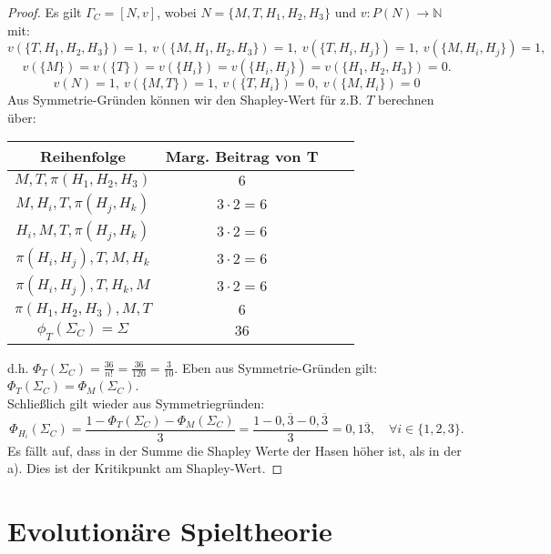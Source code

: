 \documentclass[12pt]{extreport} %
\newcommand{\N}{\mathbb{N}}
\theoremstyle{named}
\theoremstyle{itshape}
\theoremstyle{normal}
\begin{document}
\begin{enumerate}
 		\begin{proof}
 			Es gilt $\Gamma_C = [N, v]$, wobei $N = \{ M, T, H_{1}, H_{2}, H_{3} \}$ und $v \colon P(N) \rightarrow \N$ mit:
 			$$ v(\{T, H_{1}, H_{2}, H_{3} \}) = 1, ~ v(\{M, H_{1}, H_{2}, H_{3} \}) = 1,  ~ v(\{T, H_{i}, H_{j} \}) = 1, ~ v(\{M, H_{i}, H_{j} \}) = 1,$$
 			$$  v(\{M\}) = v(\{T\}) = v(\{ H_{i} \}) = v(\{ H_{i}, H_{j} \}) = v(\{ H_{1}, H_{2}, H_{3} \}) = 0. $$
 			$$ v(N) = 1, ~ v(\{M, T\}) = 1, ~v(\{T, H_{i}\}) = 0, ~ v(\{M, H_{i}\}) = 0$$
			Aus Symmetrie-Gründen können wir den Shapley-Wert für z.B. $T$ berechnen über:
  			\begin{center}
    			\begin{tabular}{| c | c | c | c |}
   					\hline
    					Reihenfolge & Marg. Beitrag von T \\ 
    						\hline
    					$M, T, \pi(H_{1}, H_{2}, H_{3})$ & $6$   \\ 
    						\hline
    					$M, H_{i}, T, \pi(H_{j}, H_{k})$ & $3 \cdot 2 = 6$  \\
    						\hline
    					$H_{i}, M, T, \pi(H_{j}, H_{k})$ & $3 \cdot 2 = 6$   \\
       						\hline
    					$\pi(H_{i}, H_{j}), T, M, H_{k}$ & $3 \cdot 2 = 6$   \\
      						\hline
    					$\pi(H_{i}, H_{j}), T, H_{k}, M$ & $3 \cdot 2 = 6$ \\
      						\hline
    					$\pi(H_{1}, H_{2}, H_{3}), M, T$  & $6$ \\
      						\hline \hline
    					$\phi_{T}(\Sigma_{C}) = \Sigma$  & $36$  \\
    				\hline
   				 \end{tabular}
    		\end{center}
    		d.h. $\Phi_{T}(\Sigma_{C}) = \frac{36}{n!} = \frac{36}{120} = \frac{3}{10}$. Eben aus Symmetrie-Gründen gilt: $\Phi_{T}(\Sigma_{C}) = \Phi_{M}(\Sigma_{C})$. \\ 
    		Schließlich gilt wieder aus Symmetriegründen:
    		$$ \Phi_{H_{i}}(\Sigma_{C}) = \frac{1 - \Phi_{T}(\Sigma_{C}) - \Phi_{M}(\Sigma_{C})}{3} = \frac{1 - 0,\overline{3} - 0,\overline{3}}{3} = 0,1\overline{3}, \quad \forall i \in \{1, 2, 3\}. $$
    		Es fällt auf, dass in der Summe die Shapley Werte der Hasen höher ist, als in der a). Dies ist der Kritikpunkt am Shapley-Wert.
 		\end{proof}
  \end{enumerate}

\chapter{Evolutionäre Spieltheorie}

\newpage


 \appendix {}  




\printindex
\end{document}
